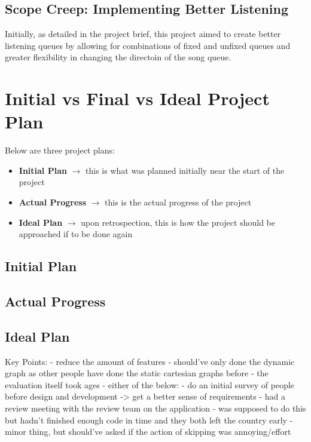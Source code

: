 \subsection{Scope Creep: Implementing Better Listening}
Initially, as detailed in the project brief, this project aimed to create better listening queues by allowing for combinations of fixed and unfixed queues and greater flexibility in changing the directoin of the song queue.

\section{Initial vs Final vs Ideal Project Plan}%
Below are three project plans:\begin{itemize}
    \item \textbf{Initial Plan} \(\to\) this is what was planned initially near the start of the project
    \item \textbf{Actual Progress} \(\to\) this is the actual progress of the project
    \item \textbf{Ideal Plan} \(\to\) upon retrospection, this is how the project should be approached if to be done again
\end{itemize}

\subsection{Initial Plan}

\subsection{Actual Progress}

\subsection{Ideal Plan}

Key Points:
- reduce the amount of features
    - should've only done the dynamic graph as other people have done the static cartesian graphs before
    - the evaluation itself took ages 
- either of the below:
    - do an initial survey of people before design and development -> get a better sense of requirements
    - had a review meeting with the review team on the application - was supposed to do this but hadn't finished enough code in time and they both left the country early
    - minor thing, but should've asked if the action of skipping was annoying/effort